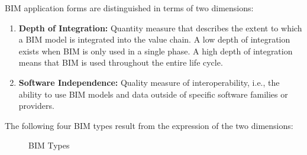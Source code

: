 \begin{English}
    BIM application forms are distinguished in terms of two dimensions: \cite{astourLehrbuchGrundlagenBIMArbeitsmethode2022}
    
    \begin{enumerate}
        \item \textbf{Depth of Integration:} Quantity measure that describes the extent to which a BIM model is integrated into the value chain. A low depth of integration exists when BIM is only used in a single phase. A high depth of integration means that BIM is used throughout the entire life cycle.
        \item \textbf{Software Independence:} Quality measure of interoperability, i.e., the ability to use BIM models and data outside of specific software families or providers.
    \end{enumerate}

    The following four BIM types result from the expression of the two dimensions:
\end{English}

\begin{figure}[h]
    \centering
    \caption{BIM Types}
\end{figure}

